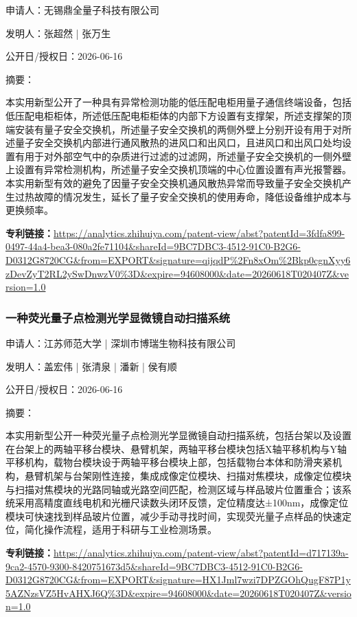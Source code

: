 \documentclass[12pt,a4paper]{ctexart}
\begin{document}
申请人：无锡鼎全量子科技有限公司

发明人：张超然 | 张万生

公开日/授权日：2026-06-16

摘要：

本实用新型公开了一种具有异常检测功能的低压配电柜用量子通信终端设备，包括低压配电柜柜体，所述低压配电柜柜体的内部下方设置有支撑架，所述支撑架的顶端安装有量子安全交换机，所述量子安全交换机的两侧外壁上分别开设有用于对所述量子安全交换机内部进行通风散热的进风口和出风口，且进风口和出风口处均设置有用于对外部空气中的杂质进行过滤的过滤网，所述量子安全交换机的一侧外壁上设置有异常检测机构，所述量子安全交换机顶端的中心位置设置有声光报警器。本实用新型有效的避免了因量子安全交换机通风散热异常而导致量子安全交换机产生过热故障的情况发生，延长了量子安全交换机的使用寿命，降低设备维护成本与更换频率。

\noindent\textbf{专利链接：}\url{https://analytics.zhihuiya.com/patent-view/abst?patentId=3fdfa899-0497-44a4-bea3-080a2fe71104&shareId=9BC7DBC3-4512-91C0-B2G6-D0312G8720CG&from=EXPORT&signature=qijqdP%2Fn8xOm%2Bkp0cgnXyy6zDevZyT2RL2ySwDnwzV0%3D&expire=94608000&date=20260618T020407Z&version=1.0}

\subsubsection{ 一种荧光量子点检测光学显微镜自动扫描系统 }

申请人：江苏师范大学 | 深圳市博瑞生物科技有限公司

发明人：盖宏伟 | 张清泉 | 潘新 | 侯有顺

公开日/授权日：2026-06-16

摘要：

本实用新型公开一种荧光量子点检测光学显微镜自动扫描系统，包括台架以及设置在台架上的两轴平移台模块、悬臂机架，两轴平移台模块包括X轴平移机构与Y轴平移机构，载物台模块设于两轴平移台模块上部，包括载物台本体和防滑夹紧机构，悬臂机架与台架刚性连接，集成成像定位模块、扫描对焦模块，成像定位模块与扫描对焦模块的光路同轴或光路空间匹配，检测区域与样品玻片位置重合；该系统采用高精度直线电机和光栅尺读数头闭环反馈，定位精度达±100nm，成像定位模块可快速找到样品玻片位置，减少手动寻找时间，实现荧光量子点样品的快速定位，简化操作流程，适用于科研与工业检测场景。

\noindent\textbf{专利链接：}\url{https://analytics.zhihuiya.com/patent-view/abst?patentId=d717139a-9ca2-4570-9300-8420751673d5&shareId=9BC7DBC3-4512-91C0-B2G6-D0312G8720CG&from=EXPORT&signature=HX1Jml7wzi7DPZGOhQugF87P1y5AZNzsVZ5HvAHXJ6Q%3D&expire=94608000&date=20260618T020407Z&version=1.0}
\end{document}
